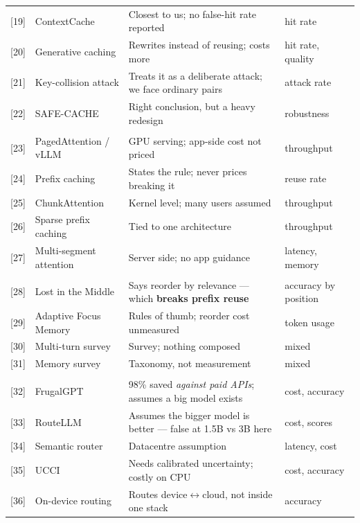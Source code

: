 \documentclass[11pt,a4paper]{article}
\begin{document}
\begin{tabularx}{\textwidth}{@{}l L{3.6cm} X l@{}}
{[19]} & ContextCache & Closest to us; no false-hit rate reported & hit rate \\
{[20]} & Generative caching & Rewrites instead of reusing; costs more & hit rate, quality \\
{[21]} & Key-collision attack & Treats it as a deliberate attack; we face ordinary pairs & attack rate \\
{[22]} & SAFE-CACHE & Right conclusion, but a heavy redesign & robustness \\
\addlinespace
{}\\
{[23]} & PagedAttention / vLLM & GPU serving; app-side cost not priced & throughput \\
{[24]} & Prefix caching & States the rule; never prices breaking it & reuse rate \\
{[25]} & ChunkAttention & Kernel level; many users assumed & throughput \\
{[26]} & Sparse prefix caching & Tied to one architecture & throughput \\
{[27]} & Multi-segment attention & Server side; no app guidance & latency, memory \\
\addlinespace
{}\\
{[28]} & Lost in the Middle & Says reorder by relevance --- which \textbf{breaks prefix reuse} & accuracy by position \\
{[29]} & Adaptive Focus Memory & Rules of thumb; reorder cost unmeasured & token usage \\
{[30]} & Multi-turn survey & Survey; nothing composed & mixed \\
{[31]} & Memory survey & Taxonomy, not measurement & mixed \\
\addlinespace
{}\\
{[32]} & FrugalGPT & 98\% saved \emph{against paid APIs}; assumes a big model exists & cost, accuracy \\
{[33]} & RouteLLM & Assumes the bigger model is better --- false at 1.5B vs 3B here & cost, scores \\
{[34]} & Semantic router & Datacentre assumption & latency, cost \\
{[35]} & UCCI & Needs calibrated uncertainty; costly on CPU & cost, accuracy \\
{[36]} & On-device routing & Routes device$\leftrightarrow$cloud, not inside one stack & accuracy \\

\end{tabularx}
\end{document}

